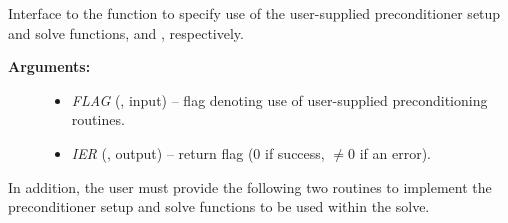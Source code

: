 \documentclass[letterpaper,10pt,english]{sphinxmanual}
\begin{document}
\begin{fulllineitems}
\label{f_interface/Usage:f/_/FARKSPILSSETPREC}
Interface to the function {\hyperref[c_interface/User_callable:c.ARKSpilsSetPreconditioner]{\emph{}}} to
specify use of the user-supplied preconditioner setup and solve
functions, {\hyperref[f_interface/Usage:f/_/FARKPSET]{\emph{}}} and {\hyperref[f_interface/Usage:f/_/FARKPSOL]{\emph{}}}, respectively.
\begin{description}
\item[{\textbf{Arguments:}}] \leavevmode\begin{itemize}
\item {} 
\emph{FLAG} (, input) -- flag denoting use of user-supplied
preconditioning routines.

\item {} 
\emph{IER}  (, output) -- return flag  (0 if success,
\(\ne 0\) if an error).

\end{itemize}

\end{description}

\end{fulllineitems}


In addition, the user must provide the following two routines to
implement the preconditioner setup and solve functions to be used
within the solve.
\end{document}
